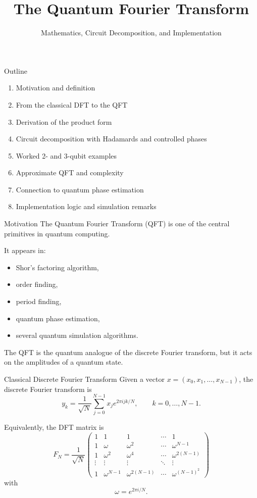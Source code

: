 \documentclass{beamer}
\title{The Quantum Fourier Transform}
\subtitle{Mathematics, Circuit Decomposition, and Implementation}
\author{}
\date{}
\begin{document}
\frame{\titlepage}

\begin{frame}{Outline}
\begin{enumerate}
\item Motivation and definition
\item From the classical DFT to the QFT
\item Derivation of the product form
\item Circuit decomposition with Hadamards and controlled phases
\item Worked 2- and 3-qubit examples
\item Approximate QFT and complexity
\item Connection to quantum phase estimation
\item Implementation logic and simulation remarks
\end{enumerate}
\end{frame}

\begin{frame}{Motivation}
The Quantum Fourier Transform (QFT) is one of the central primitives in quantum computing.

It appears in:
\begin{itemize}
\item Shor's factoring algorithm,
\item order finding,
\item period finding,
\item quantum phase estimation,
\item several quantum simulation algorithms.
\end{itemize}

The QFT is the quantum analogue of the discrete Fourier transform, but it acts on the amplitudes of a quantum state.
\end{frame}

\begin{frame}{Classical Discrete Fourier Transform}
Given a vector \(x=(x_0,x_1,\dots,x_{N-1})\), the discrete Fourier transform is
\[
y_k = \frac{1}{\sqrt N}\sum_{j=0}^{N-1} x_j e^{2\pi i jk/N},
\qquad k=0,\dots,N-1.
\]

Equivalently, the DFT matrix is
\[
F_N = \frac{1}{\sqrt N}
\begin{pmatrix}
1 & 1 & 1 & \cdots & 1 \\
1 & \omega & \omega^2 & \cdots & \omega^{N-1} \\
1 & \omega^2 & \omega^4 & \cdots & \omega^{2(N-1)} \\
\vdots & \vdots & \vdots & \ddots & \vdots \\
1 & \omega^{N-1} & \omega^{2(N-1)} & \cdots & \omega^{(N-1)^2}
\end{pmatrix}
\]
with
\[
\omega = e^{2\pi i/N}.
\]
\end{frame}
\end{document}
